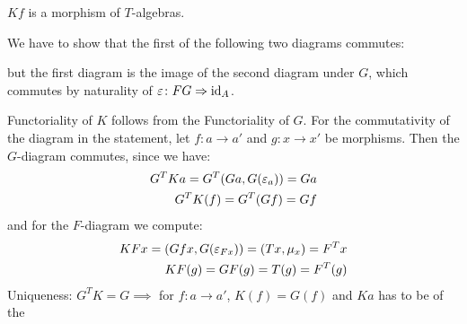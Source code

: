 \begin{beweis}
    \begin{claim*}
        $Kf$ is a morphism of $T$-algebras.
    \end{claim*}
    \begin{smallproof}
        We have to show that the first of the following two diagrams commutes:
        \begin{figure}[H]
        \centering
        \begin{subfigure}{0.4\textwidth}
        \centering
        \end{subfigure}
        \hspace{2em}
        \begin{subfigure}{0.4\textwidth}
        \centering
        \end{subfigure}
        \end{figure}
        but the first diagram is the image of the second diagram under $G$,
        which commutes by naturality of $\varepsilon \colon FG \Rightarrow \operatorname{id}_A$.
    \end{smallproof}
    Functoriality of $K$ follows from the Functoriality of $G$.
    For the commutativity of the diagram in the statement, let $f \colon a \to a'$ and $g \colon x \to x'$ 
    be morphisms. Then the $G$-diagram commutes, since we have:
    \begin{align*}
        G^TKa = G^T(Ga,G(\varepsilon_a)) = Ga \\
        G^TK(f) = G^T(Gf) = Gf
    \end{align*}
    and for the $F$-diagram we compute:
    \begin{align*}
        KFx = (Gfx,G(\varepsilon_{Fx})) = (Tx,\mu_x) = F^Tx \\
        KF(g) = GF(g) = T(g) = F^T(g)
    \end{align*}
    Uniqueness: $G^TK = G \implies$ for $f \colon a \to a'$, $K(f) = G(f)$ and $Ka$ has to be of the

\end{beweis}
